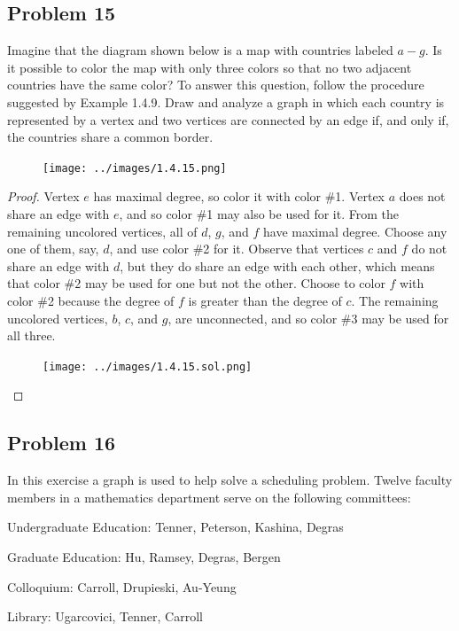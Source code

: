 \documentclass[14pt]{extarticle}
\begin{document}
\subsection{Problem 15}
Imagine that the diagram shown below is a map with countries labeled $a-g$.
Is it possible to color the map with only three colors so that no two adjacent
countries have the same color? To answer this question, follow the procedure
suggested by Example 1.4.9. Draw and analyze a graph in which each country is
represented by a vertex and two vertices are connected by an edge if, and only
if, the countries share a common border.

\begin{figure}[ht!]
\centering
\texttt{[image: ../images/1.4.15.png]}
\end{figure}

\begin{proof}
Vertex $e$ has maximal degree, so color it with color \#1. Vertex $a$ does not
share an edge with $e$, and so color \#1 may also be used for it. From the
remaining uncolored vertices, all of $d$, $g$, and $f$ have maximal degree.
Choose any one of them, say, $d$, and use color \#2 for it. Observe that
vertices $c$ and $f$ do not share an edge with $d$, but they do share an edge
with each other, which means that color \#2 may be used for one but not the
other. Choose to color $f$ with color \#2 because the degree of $f$ is greater
than the degree of $c$. The remaining uncolored vertices, $b$, $c$, and $g$,
are unconnected, and so color \#3 may be used for all three.

\begin{figure}[ht!]
\centering
\texttt{[image: ../images/1.4.15.sol.png]}
\end{figure}
\end{proof}

\subsection{Problem 16}
In this exercise a graph is used to help solve a scheduling problem. Twelve
faculty members in a mathematics department serve on the following
committees:

Undergraduate Education: Tenner, Peterson, Kashina, Degras

Graduate Education: Hu, Ramsey, Degras, Bergen

Colloquium: Carroll, Drupieski, Au-Yeung

Library: Ugarcovici, Tenner, Carroll
\end{document}
